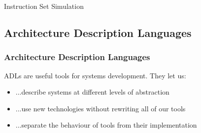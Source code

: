 \begin{frame}[t]{Instruction Set Simulation}

\end{frame}

\subsection{Architecture Description Languages}

\begin{frame}
\frametitle{Architecture Description Languages}

ADLs are useful tools for systems development. They let us:
\begin{itemize}
	\item<2-> ...describe systems at different levels of abstraction
	\item<3-> ...use new technologies without rewriting all of our tools
	\item<4-> ...separate the behaviour of tools from their implementation
\end{itemize}

\end{frame}


